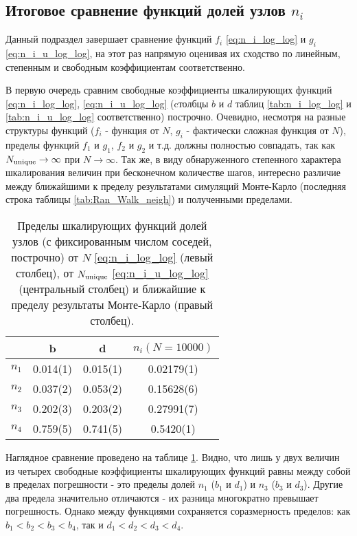 \subsection{Итоговое сравнение функций долей узлов $n_i$}

Данный подраздел завершает сравнение функций $f_i$ \eqref{eq:n_i_log_log} и $g_i$ \eqref{eq:n_i_u_log_log}, на этот раз напрямую оценивая их сходство по линейным, степенным и свободным коэффициентам соответственно.

В первую очередь сравним свободные коэффициенты шкалирующих функций \eqref{eq:n_i_log_log}, \eqref{eq:n_i_u_log_log} (cтолбцы $b$ и $d$ таблиц \ref{tab:n_i_log_log} и \ref{tab:n_i_u_log_log} соответственно) построчно. Очевидно, несмотря на разные структуры функций ($f_i$ - функция от $N$, $g_i$ - фактически сложная функция от $N$), пределы функций $f_1$ и $g_1$, $f_2$ и $g_2$ и т.д. должны полностью совпадать, так как $N_{\textup{unique}} \to \infty$ при $N \to \infty$. Так же, в виду обнаруженного степенного характера шкалирования величин при бесконечном количестве шагов, интересно различие между ближайшими к пределу результатами симуляций Монте-Карло (последняя строка таблицы \ref{tab:Ran_Walk_neigh}) и полученными пределами. 

\begin{table}[h]
\centering
\begin{tabular}{|c|c|c|c|}
\hline
 & b & d & $n_i(N=10000)$ \\ \hline
$n_1$ & 0.014(1) & 0.015(1) & 0.02179(1)\\ \hline
$n_2$ & 0.037(2) & 0.053(2) & 0.15628(6)\\ \hline
$n_3$ & 0.202(3) & 0.203(2) & 0.27991(7)\\ \hline
$n_4$ & 0.759(5) & 0.741(5) & 0.5420(1)\\ \hline
\end{tabular}
\caption{Пределы шкалирующих функций долей узлов (с фиксированным числом соседей, построчно) от $N$ \eqref{eq:n_i_log_log} (левый столбец), от $N_{\textup{unique}}$ \eqref{eq:n_i_u_log_log} (центральный столбец) и ближайшие к пределу результаты Монте-Карло (правый столбец).}
\label{tab:bd_compare}
\end{table}

Наглядное сравнение проведено на таблице \ref{tab:bd_compare}. 
Видно, что лишь у двух величин из четырех свободные коэффициенты шкалирующих функций равны между собой в пределах погрешности - это пределы долей $n_1$ ($b_1$ и $d_1$) и $n_3$ ($b_3$ и $d_3$). 
Другие два предела значительно отличаются - их разница многократно превышает погрешность.
Однако между функциями сохраняется соразмерность пределов: как $b_1 < b_2 < b_3 < b_4$, так и $d_1 < d_2 < d_3 < d_4$.


